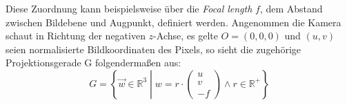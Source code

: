 \documentclass[ngerman,a4paper,parskip=half]{scrartcl}
\def \R{\mathbb{R}}
\def \fov{\mathrm{fov}}
\begin{document}
Diese Zuordnung kann beispielsweise über die \emph{Focal length} $f$, dem Abstand zwischen Bildebene und Augpunkt, definiert werden. Angenommen die Kamera schaut in Richtung der negativen $z$-Achse, es gelte $O = (0, 0, 0)$ und $(u,v)$ seien normalisierte Bildkoordinaten des Pixels, so sieht die zugehörige Projektionsgerade G folgendermaßen aus:
\[ G = \left\lbrace \vec{w} \in \R^3 \middle\vert w = r \cdot \begin{pmatrix}
u \\ v \\ -f
\end{pmatrix} \land r \in \R^+ \right\rbrace \]




\end{document}
